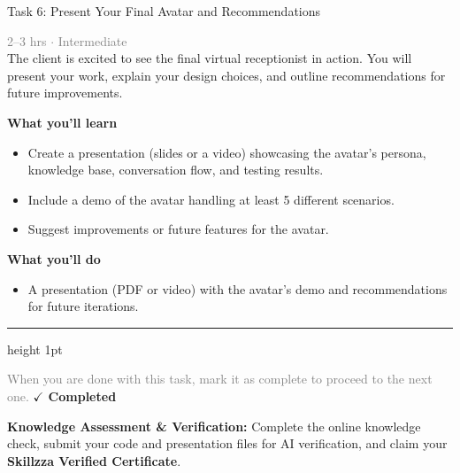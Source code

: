 \documentclass[10pt,a4paper]{article}
\begin{document}
\begin{taskbox}{Task 6: Present Your Final Avatar and Recommendations}

    {\small \textcolor{gray}{2--3 hrs $\cdot$ Intermediate}}\\[12pt]

      
The client is excited to see the final virtual receptionist in action. You will present your work, explain your design choices, and outline recommendations for future improvements.


\vspace{8pt}
{\large \textbf{\textcolor{brandLight}{What you'll learn}}}\\[4pt]  
\begin{itemize}
    \item Create a presentation (slides or a video) showcasing the avatar’s persona, knowledge base, conversation flow, and testing results.  
    \item Include a demo of the avatar handling at least 5 different scenarios.  
    \item Suggest improvements or future features for the avatar.  
\end{itemize}

\vspace{8pt}
{\large \textbf{\textcolor{brandLight}{What you'll do}}}\\[4pt]  
\begin{itemize}
    \item A presentation (PDF or video) with the avatar’s demo and recommendations for future iterations.\par
\end{itemize}

    \vspace{16pt}

    \textcolor{cardBorder}{\hrule height 1pt}\vspace{8pt}

    \small \textcolor{gray}{When you are done with this task, mark it as complete to proceed to the next one.} \hfill \textbf{\textcolor{brandDark}{$\checkmark$ Completed}}

\end{taskbox}

\begin{completionbox}
    \textbf{Knowledge Assessment \& Verification:} Complete the online knowledge check, submit your code and presentation files for AI verification, and claim your \textbf{Skillzza Verified Certificate}.
\end{completionbox}
\end{document}
